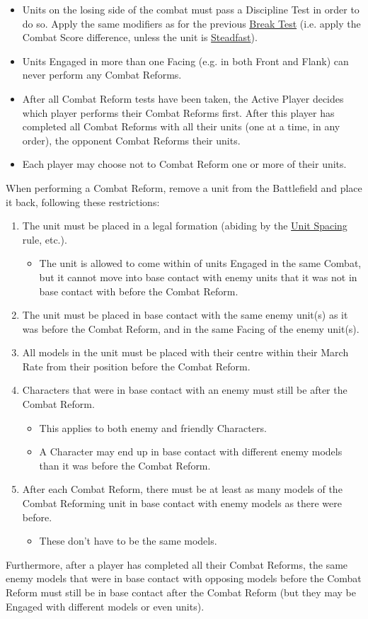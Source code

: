 \begin{itemize}[label={-}]
\item Units on the losing side of the combat must pass a Discipline Test in order to do so. Apply the same modifiers as for the previous \hyperref[break_test]{Break Test} (i.e. apply the Combat Score difference, unless the unit is \hyperref[steadfast]{Steadfast}).
\item Units Engaged in more than one Facing (e.g. in both Front and Flank) can never perform any Combat Reforms.
\item After all Combat Reform tests have been taken, the Active Player decides which player performs their Combat Reforms first. After this player has completed all Combat Reforms with all their units (one at a time, in any order), the opponent Combat Reforms their units.
\item Each player may choose not to Combat Reform one or more of their units.
\end{itemize}

When performing a Combat Reform, remove a unit from the Battlefield and place it back, following these restrictions:

\begin{enumerate}
\item The unit must be placed in a legal formation (abiding by the \hyperref[unit_spacing]{Unit Spacing} rule, etc.).
\begin{itemize}[label={-}]
\item The unit is allowed to come within  of units Engaged in the same Combat, but it cannot move into base contact with enemy units that it was not in base contact with before the Combat Reform.
\end{itemize}
\item The unit must be placed in base contact with the same enemy unit(s) as it was before the Combat Reform, and in the same Facing of the enemy unit(s).
\item All models in the unit must be placed with their centre within their March Rate from their position before the Combat Reform.
\item Characters that were in base contact with an enemy must still be after the Combat Reform.
\begin{itemize}[label={-}]
\item This applies to both enemy and friendly Characters.
\item A Character may end up in base contact with different enemy models than it was before the Combat Reform.
\end{itemize}
\item After each Combat Reform, there must be at least as many models of the Combat Reforming unit in base contact with enemy models as there were before.
\begin{itemize}[label={-}]
\item These don't have to be the same models.
\end{itemize}
\end{enumerate}

Furthermore, after a player has completed all their Combat Reforms, the same enemy models that were in base contact with opposing models before the Combat Reform must still be in base contact after the Combat Reform (but they may be Engaged with different models or even units).
